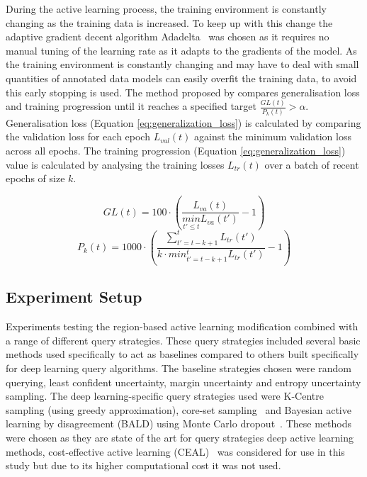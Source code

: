 During the active learning process, the training environment is constantly changing as the training data is increased. To keep up with this change the adaptive gradient decent algorithm Adadelta~\citep{zeiler2012adadelta} was chosen as it requires no manual tuning of the learning rate as it adapts to the gradients of the model. As the training environment is constantly changing and may have to deal with small quantities of annotated data models can easily overfit the training data, to avoid this early stopping is used. The method proposed by \cite{prechelt1998early} compares generalisation loss and training progression until it reaches a specified target $\frac{GL(t)}{P_k(t)} > \alpha$. Generalisation loss (Equation \ref{eq:generalization_loss}) is calculated by comparing the validation loss for each epoch \(L_{val}(t)\) against the minimum validation loss across all epochs. The training progression (Equation \ref{eq:generalization_loss}) value is calculated by analysing the training losses \(L_{tr}(t)\) over a batch of recent epochs of size \(k\).

\begin{equation}
	GL(t) = 100 \cdot \left ( \frac{L_{va}(t)}{\underset{t'\leq t}{min}L_{va}(t')} - 1 \right )
	\label{eq:generalization_loss}
\end{equation}
\begin{equation}
	P_k(t) = 1000 \cdot \left ( \frac{\sum_{t'=t-k+1}^{t}L_{tr}(t')}{k \cdot min^{t}_{t'=t-k+1}L_{tr}(t')} - 1\right )
	\label{eq:training_progression}
\end{equation}

\subsection{Experiment Setup}
\label{subsec:active_experiments}
Experiments testing the region-based active learning modification combined with a range of different query strategies. These query strategies included several basic methods used specifically to act as baselines compared to others built specifically for deep learning query algorithms. The baseline strategies chosen were random querying, least confident uncertainty, margin uncertainty and entropy uncertainty sampling. The deep learning-specific query strategies used were K-Centre sampling (using greedy approximation), core-set sampling~\citep{sener2017active} and Bayesian active learning by disagreement (BALD) using Monte Carlo dropout~\citep{gal2017deep}. These methods were chosen as they are state of the art for query strategies deep active learning methods, cost-effective active learning (CEAL)~\citep{wang2016cost} was considered for use in this study but due to its higher computational cost it was not used.

